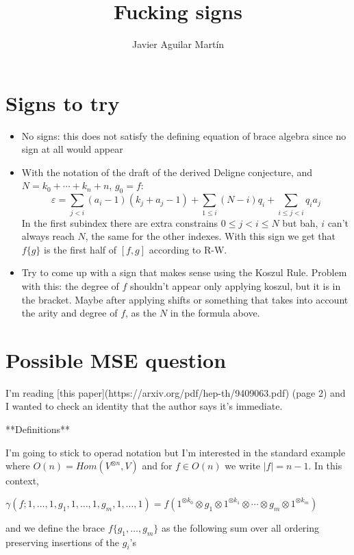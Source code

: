 \documentclass[twoside]{article}
\begin{document}
\title{Fucking signs}
\author{Javier Aguilar Martín}
\maketitle


\section{Signs to try}
\begin{itemize}
\item No signs: this does not satisfy the defining equation of brace algebra since no sign at all would appear
\item With the notation of the draft of the derived Deligne conjecture, and $N=k_0+\cdots+k_n+n$, $g_0=f$:
\[
\varepsilon=\sum_{j<i}(a_i-1)(k_j+a_j-1)+\sum_{1\leq i}(N-i)q_i+\sum_{i\leq j<i}q_ia_j
\]
In the first subindex there are extra constrains $0\leq j<i\leq N$ but bah, $i$ can't always reach $N$, the same for the other indexes. With this sign we get that $f\{g\}$ is the first half of $[f,g]$ according to R-W.

\item Try to come up with a sign that makes sense using the Koszul Rule. Problem with this: the degree of $f$ shouldn't appear only applying koszul, but it is in the bracket. Maybe after applying shifts or something that takes into account the arity and degree of $f$, as the $N$ in the formula above.
\end{itemize}
\section{Possible MSE question}

I'm reading [this paper](https://arxiv.org/pdf/hep-th/9409063.pdf) (page 2) and I wanted to check an identity that the author says it's immediate. 

**Definitions**

I'm going to stick to operad notation but I'm interested in the standard example where $O(n)=Hom(V^{\otimes n},V)$ and for $f\in O(n)$ we write $|f|=n-1$. In this context, 

$\gamma(f;1,\dots,1,g_1,1,\dots, 1, g_m,1,\dots, 1)=f(1^{\otimes k_0}\otimes g_1\otimes 1^{\otimes k_1}\otimes\cdots\otimes g_m\otimes 1^{\otimes k_m})$

and we define the brace $f\{g_1,\dots,g_m\}$ as the following sum over all ordering preserving insertions of the $g_i$'s
\end{document}
